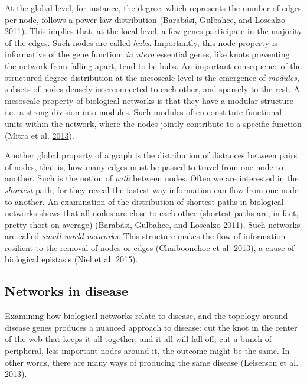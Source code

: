 \documentclass[
  11pt,
]{env/yjiao}
\begin{document}
At the global level, for instance, the degree, which represents the number of edges per node, follows a power-law distribution (Barabási, Gulbahce, and Loscalzo \protect\hyperlink{ref-barabasi_network_2011}{2011}). This implies that, at the local level, a few genes participate in the majority of the edges. Such nodes are called \emph{hubs}. Importantly, this node property is informative of the gene function: \emph{in utero} essential genes, like knots preventing the network from falling apart, tend to be hubs. An important consequence of the structured degree distribution at the mesoscale level is the emergence of \emph{modules}, subsets of nodes densely interconnected to each other, and sparsely to the rest. A mesoscale property of biological networks is that they have a modular structure i.e.~a strong division into modules. Such modules often constitute functional units within the network, where the nodes jointly contribute to a specific function (Mitra et al. \protect\hyperlink{ref-mitra_integrative_2013}{2013}).

Another global property of a graph is the distribution of distances between pairs of nodes, that is, how many edges must be passed to travel from one node to another. Such is the notion of \emph{path} between nodes. Often we are interested in the \emph{shortest} path, for they reveal the fastest way information can flow from one node to another. An examination of the distribution of shortest paths in biological networks shows that all nodes are close to each other (shortest paths are, in fact, pretty short on average) (Barabási, Gulbahce, and Loscalzo \protect\hyperlink{ref-barabasi_network_2011}{2011}). Such networks are called \emph{small world networks}. This structure makes the flow of information resilient to the removal of nodes or edges (Chaiboonchoe et al. \protect\hyperlink{ref-Chaiboonchoe2013}{2013}), a cause of biological epistasis (Niel et al. \protect\hyperlink{ref-niel_survey_2015}{2015}).

\hypertarget{networks-in-disease}{%
\subsection{Networks in disease}\label{networks-in-disease}}

Examining how biological networks relate to disease, and the topology around disease genes produces a nuanced approach to disease: cut the knot in the center of the web that keeps it all together, and it all will fall off; cut a bunch of peripheral, less important nodes around it, the outcome might be the same. In other words, there are many ways of producing the same disease (Leiserson et al. \protect\hyperlink{ref-leiserson_network_2013}{2013}).
\end{document}
